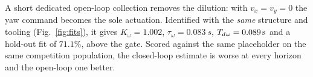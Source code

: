 A short dedicated open-loop collection removes the dilution: with
$v_x = v_y = 0$ the yaw command becomes the sole actuation. Identified with the
\emph{same} structure and tooling (Fig.~\ref{fig:fits}), it gives
$K_\omega = 1.002$, $\tau_\omega = \SI{0.083}{s}$, $T_{d}{}_\omega = \SI{0.089}{s}$
and a hold-out fit of $71.1\%$, above the gate. Scored against the same
placeholder on the same competition population, the closed-loop estimate is
worse at every horizon and the open-loop one better.